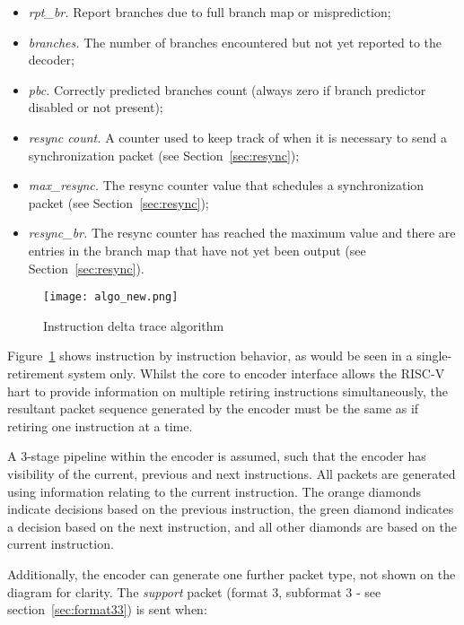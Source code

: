 \begin{itemize}
  \item \textit{rpt\_br.} Report branches due to full branch map or misprediction;
  \item \textit{branches.}  The number of branches encountered but not yet reported to the decoder;
  \item \textit{pbc.} Correctly predicted branches count (always zero if branch predictor disabled or not present);
  \item \textit{resync count.} A counter used to keep track of when it is necessary to send 
    a synchronization packet (see Section~\ref{sec:resync});
  \item \textit{max\_resync.}  The resync counter value that schedules a synchronization packet (see Section~\ref{sec:resync});
  \item \textit{resync\_br.} The resync counter has reached the maximum value and there are
    entries in the branch map that have not yet been output (see Section~\ref{sec:resync}).
\end{itemize}

\begin{figure}
\begin{center}
  \texttt{[image: algo\_new.png]}
  \caption{Instruction delta trace algorithm}
  \label{fig:algo}
\end{center}
\end{figure}

Figure~\ref{fig:algo} shows instruction by instruction behavior, as would be
seen in a single-retirement system only.  Whilst the core to encoder interface allows the 
RISC-V hart to provide information on multiple retiring instructions simultaneously, the resultant 
packet sequence generated by the encoder must be the same as if retiring one instruction at a time.

A 3-stage pipeline within the encoder is assumed, such that the encoder has 
visibility of the current, previous and next instructions.  All packets are generated using 
information relating to the current instruction.  The orange diamonds indicate decisions 
based on the previous instruction, the green diamond indicates a decision based on the
next instruction, and all other diamonds are based on the current instruction.

Additionally, the encoder can generate one further packet type, not shown on the diagram for 
clarity.  The \textit{support} packet (format 3, subformat 3 - see section~\ref{sec:format33}) is 
sent when:

